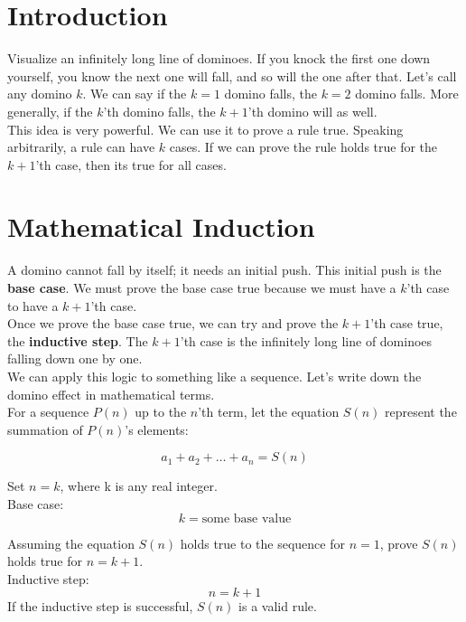 \documentclass{article}
\begin{document}
 
\section{Introduction}
 
Visualize an infinitely long line of dominoes. If you knock the first one down yourself, you know the next one will fall, and so will the one after that.
Let's call any domino $k$. We can say if the $k=1$ domino falls, the $k=2$ domino falls. More generally, if the $k$'th domino falls, the $k+1$'th domino will as well. \\

\noindent
This idea is very powerful. We can use it to prove a rule true. Speaking arbitrarily, a rule can have $k$ cases. If we can prove the rule holds true for the $k+1$'th case, then its true for all cases. 

\section{Mathematical Induction}
A domino cannot fall by itself; it needs an initial push. This initial push is the \textbf{base case}. We must prove the base case true because we must have a $k$'th case to have a $k+1$'th case. \\

\noindent
Once we prove the base case true, we can try and prove the $k+1$'th case true, the \textbf{inductive step}. The $k+1$'th case is the infinitely long line of dominoes falling down one by one. \\

\noindent
We can apply this logic to something like a sequence. Let's write down the domino effect in mathematical terms.\\

\noindent
For a sequence $P(n)$ up to the $n$'th term, let the equation $S(n)$ represent the summation of $P(n)$'s elements:

\[
a_{1} + a_{2} + \dots + a_{n} = S(n)
\]

\noindent
Set $n = k$, where k is any real integer. \\

\noindent	
Base case: \\
\[
k = \text{some base value}
\]

\noindent
Assuming the equation $S(n)$ holds true to the sequence for $n = 1$, prove $S(n)$ holds true for $n = k + 1$. \\

\noindent
Inductive step:
\[
n = k + 1
\]
If the inductive step is successful, $S(n)$ is a valid rule.
\end{document}

